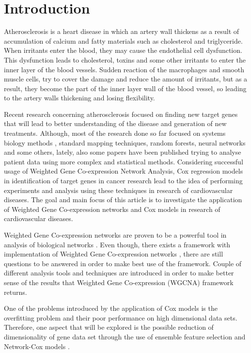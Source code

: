 \documentclass{ba-kecs}
\numberwithin{figure}{section}
\numberwithin{equation}{section}
\begin{document}
\section{Introduction}
Atherosclerosis is a heart disease in which an artery wall thickens as a result of accumulation of calcium and fatty materials such as cholesterol and triglyceride. When irritants enter the blood, they may cause the endothelial cell dysfunction. This dysfunction leads to cholesterol, toxins and some other irritants to enter the inner layer of the blood vessels. Sudden reaction of the macrophages and smooth muscle cells, try to cover the damage and reduce the amount of irritants, but as a result, they become the part of the inner layer wall of the blood vessel, so leading to the artery walls thickening and losing flexibility.

Recent research concerning atherosclerosis focused on finding new target genes that will lead to better understanding of the disease and generation of new treatments. Although, most of the research done so far focused on systems biology methods \cite{systems}, standard mapping techniques, random forests, neural networks and some others, lately, also some papers have been published trying to analyse patient data using more complex and statistical methods. Considering successful usage of Weighted Gene Co-expression Network Analysis, Cox regression models in identification of target genes in cancer research\cite{wgcna2,cox2,netcox} lead to the idea of performing experiments and analysis using these techniques in research of cardiovascular diseases. The goal and main focus of this article is to investigate the application of Weighted Gene Co-expression networks and Cox models in research of cardiovascular diseases.

Weighted Gene Co-expression networks are proven to be a powerful tool in analysis of biological networks \cite{wgcna2}. Even though, there exists a framework with implementation of Weighted Gene Co-expression networks \cite{wgcna3}, there are still questions to be answered in order to make best use of the framework. Couple of different analysis tools and techniques are introduced in order to make better sense of the results that Weighted Gene Co-expression (WGCNA) framework returns.

One of the problems introduced by the application of Cox models is the overfitting problem and their poor performance on high dimensional data sets. Therefore, one aspect that will be explored is the possible reduction of dimensionality of gene data set through the use of ensemble feature selection and Network-Cox models \cite{bootstrap,netcox}.
\end{document}
